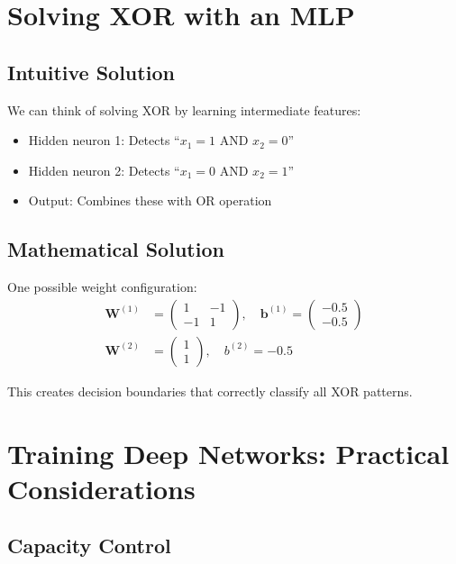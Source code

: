 \documentclass{article}
\begin{document}
\section{Solving XOR with an MLP}

\subsection{Intuitive Solution}

We can think of solving XOR by learning intermediate features:
\begin{itemize}
    \item Hidden neuron 1: Detects ``$x_1 = 1$ AND $x_2 = 0$''
    \item Hidden neuron 2: Detects ``$x_1 = 0$ AND $x_2 = 1$''
    \item Output: Combines these with OR operation
\end{itemize}

\subsection{Mathematical Solution}

One possible weight configuration:
\begin{align}
\mathbf{W}^{(1)} &= \begin{pmatrix} 1 & -1 \\ -1 & 1 \end{pmatrix}, \quad \mathbf{b}^{(1)} = \begin{pmatrix} -0.5 \\ -0.5 \end{pmatrix} \\
\mathbf{W}^{(2)} &= \begin{pmatrix} 1 \\ 1 \end{pmatrix}, \quad b^{(2)} = -0.5
\end{align}

This creates decision boundaries that correctly classify all XOR patterns.

\section{Training Deep Networks: Practical Considerations}

\subsection{Capacity Control}
\end{document}
